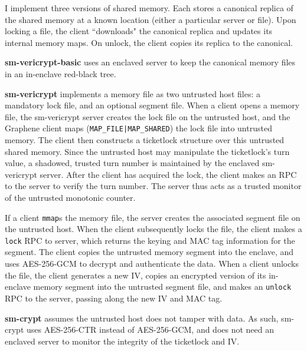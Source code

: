I implement three versions of shared memory.
%
Each stores a canonical replica of the shared memory at a known
location (either a particular server or file).
%
Upon locking a file, the client ``downloads" the canonical replica and updates
its internal memory maps.
%
On unlock, the client copies its replica to the canonical.
%

\vspace*{-0.5\baselineskip}
\begin{widelist}

\item 
%
\textbf{sm-vericrypt-basic} uses an enclaved server to keep the canonical
memory files in an in-enclave red-black tree.

\item 
% 
\textbf{sm-vericrypt} implements a memory file as two untrusted host files: a
mandatory lock file, and an optional segment file.
%
When a client opens a memory file, the sm-vericrypt server creates the lock file on the
untrusted host, and the Graphene client maps (\texttt{MAP\_FILE|MAP\_SHARED})
the lock file into untrusted memory.
%
The client then constructs a ticketlock structure over this untrusted shared
memory.
%
Since the untrusted host may manipulate the ticketlock's turn value, a
shadowed, trusted turn number is maintained by the enclaved sm-vericrypt
server.
%
After the client has acquired the lock, the client makes an RPC to the
server to verify the turn number.
%
The server thus acts as a trusted monitor of the untrusted monotonic
	counter.


If a client \texttt{mmap}s the memory file, the server creates the
associated segment file on the untrusted host.
%
When the client subsequently locks the file, the client makes a \texttt{lock}
RPC to server, which returns the keying and MAC tag information for
the segment.
%
The client copies the untrusted memory segment into the enclave, and uses
AES-256-GCM to decrypt and authenticate the data.
% 
When a client unlocks the file, the client generates a new IV, copies an
encrypted version of its in-enclave memory segment into the untrusted
segment file, and makes an \texttt{unlock} RPC to the server, passing along
the new IV and MAC tag.


\item 
%    
\textbf{sm-crypt} 
	assumes the untrusted host does not
tamper with data.  As such, sm-crypt uses AES-256-CTR instead of AES-256-GCM,
and does not need an enclaved server to monitor the integrity of the ticketlock
and IV.

\end{widelist}


